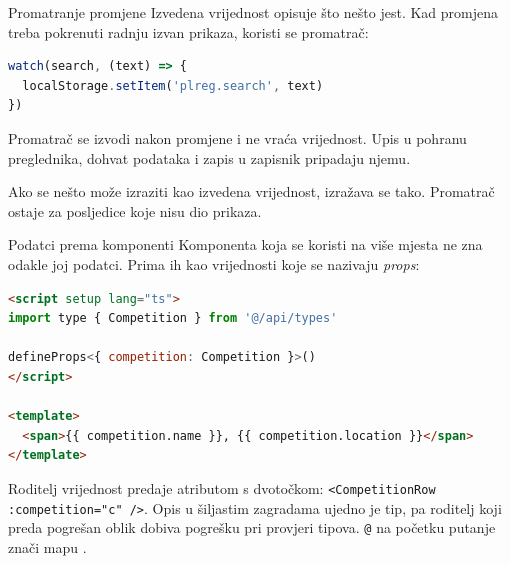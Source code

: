 \begin{frame}[fragile]{Promatranje promjene}
Izvedena vrijednost opisuje što nešto jest. Kad promjena treba pokrenuti radnju izvan prikaza, koristi se promatrač:

\begin{lstlisting}[language=typescript]
watch(search, (text) => {
  localStorage.setItem('plreg.search', text)
})
\end{lstlisting}

\vspace{0.3em}
Promatrač se izvodi nakon promjene i ne vraća vrijednost. Upis u pohranu preglednika, dohvat podataka i zapis u zapisnik pripadaju njemu.

\vspace{0.6em}
\begin{konvencija}
Ako se nešto može izraziti kao izvedena vrijednost, izražava se tako. Promatrač ostaje za posljedice koje nisu dio prikaza.
\end{konvencija}
\end{frame}

\begin{frame}[fragile]{Podatci prema komponenti}
Komponenta koja se koristi na više mjesta ne zna odakle joj podatci. Prima ih kao vrijednosti koje se nazivaju \emph{props}:

\begin{lstlisting}[language=html]
<script setup lang="ts">
import type { Competition } from '@/api/types'

defineProps<{ competition: Competition }>()
</script>

<template>
  <span>{{ competition.name }}, {{ competition.location }}</span>
</template>
\end{lstlisting}

\vspace{0.3em}
Roditelj vrijednost predaje atributom s dvotočkom: \texttt{<CompetitionRow :competition="c" />}. Opis u šiljastim zagradama ujedno je tip, pa roditelj koji preda pogrešan oblik dobiva pogrešku pri provjeri tipova. \texttt{@} na početku putanje znači mapu .
\end{frame}

